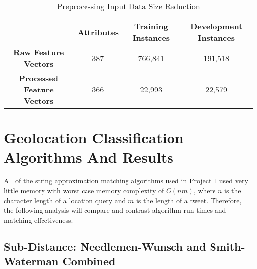 \documentclass[11pt]{article}
\begin{document}
\begin{table} [th]
\caption{Preprocessing Input Data Size Reduction}
\centering
	\begin{tabular}{| c | c | c | c |}
	\hline
	 & \textbf{Attributes} & \textbf{Training Instances} & \textbf{Development Instances}  \\
	\hline
	\textbf{Raw Feature Vectors} & 387 & 766,841 & 191,518\\
	\hline
	\textbf{Processed Feature Vectors} & 366 & 22,993 & 22,579\\
	\hline
	\end{tabular}
\label{table:input-table}
\end{table}

\section{Geolocation Classification Algorithms And Results}

All of the string approximation matching algorithms used in Project 1 used very little memory with worst case memory complexity of $O(nm)$, where $n$ is the character length of a location query and $m$ is the length of a tweet. Therefore, the following analysis will compare and contrast algorithm run times and matching effectiveness.    

\subsection{Sub-Distance: Needlemen-Wunsch and Smith-Waterman Combined}
\end{document}
